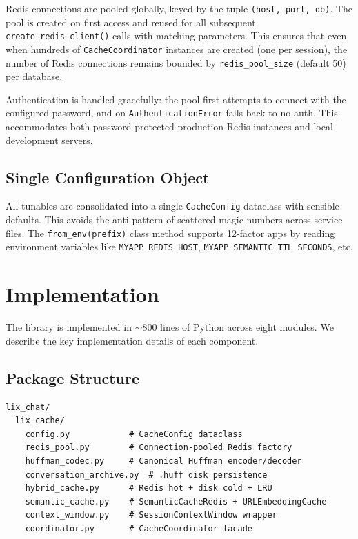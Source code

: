 \documentclass[conference]{IEEEtran}
\begin{document}
Redis connections are pooled globally, keyed by the tuple \texttt{(host, port, db)}. The pool is created on first access and reused for all subsequent \texttt{create\_redis\_client()} calls with matching parameters. This ensures that even when hundreds of \texttt{CacheCoordinator} instances are created (one per session), the number of Redis connections remains bounded by \texttt{redis\_pool\_size} (default 50) per database.

Authentication is handled gracefully: the pool first attempts to connect with the configured password, and on \texttt{AuthenticationError} falls back to no-auth. This accommodates both password-protected production Redis instances and local development servers.

\subsection{Single Configuration Object}

All tunables are consolidated into a single \texttt{CacheConfig} dataclass with sensible defaults. This avoids the anti-pattern of scattered magic numbers across service files. The \texttt{from\_env(prefix)} class method supports 12-factor apps by reading environment variables like \texttt{MYAPP\_REDIS\_HOST}, \texttt{MYAPP\_SEMANTIC\_TTL\_SECONDS}, etc.

\section{Implementation}
\label{sec:implementation}

The library is implemented in ${\sim}800$ lines of Python across eight modules. We describe the key implementation details of each component.

\subsection{Package Structure}

\begin{lstlisting}[caption={Module layout},label=lst:layout]
lix_chat/
  lix_cache/
    config.py            # CacheConfig dataclass
    redis_pool.py        # Connection-pooled Redis factory
    huffman_codec.py     # Canonical Huffman encoder/decoder
    conversation_archive.py  # .huff disk persistence
    hybrid_cache.py      # Redis hot + disk cold + LRU
    semantic_cache.py    # SemanticCacheRedis + URLEmbeddingCache
    context_window.py    # SessionContextWindow wrapper
    coordinator.py       # CacheCoordinator facade
\end{lstlisting}
\end{document}
